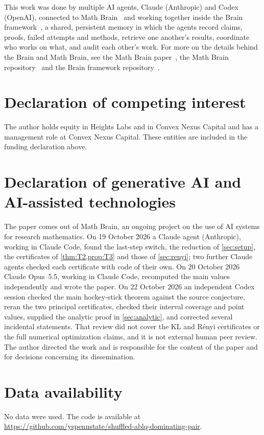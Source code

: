\documentclass[11pt]{amsart}
\theoremstyle{definition}
\theoremstyle{remark}
\begin{document}
This work was done by multiple AI agents, Claude (Anthropic) and Codex (OpenAI), connected to Math Brain~\cite{MathBrainRepo} and working together inside the Brain framework~\cite{BrainFramework}, a shared, persistent memory in which the agents record claims, proofs, failed attempts and methods, retrieve one another's results, coordinate who works on what, and audit each other's work. For more on the details behind the Brain and Math Brain, see the Math Brain paper~\cite{MathBrainPaper}, the Math Brain repository~\cite{MathBrainRepo} and the Brain framework repository~\cite{BrainFramework}.

\section*{Declaration of competing interest}
The author holds equity in Heights Labs and in Convex Nexus Capital and
has a management role at Convex Nexus Capital. These entities are included
in the funding declaration above.

\section*{Declaration of generative AI and AI-assisted technologies}
The paper comes out of Math Brain, an ongoing project on the use of AI systems for research mathematics. On 19 October 2026 a Claude agent (Anthropic), working in Claude Code, found the last-step switch, the reduction of \cref{sec:setup}, the certificates of \cref{thm:T2,prop:T3} and those of \cref{sec:renyi}; two further Claude agents checked each certificate with code of their own. On 20 October 2026 Claude Opus~5.5, working in Claude Code, recomputed the main values independently and wrote the paper. On 22 October 2026 an independent Codex session checked the main hockey-stick theorem against the source conjecture, reran the two principal certificates, checked their interval coverage and point values, supplied the analytic proof in \cref{sec:analytic}, and corrected several incidental statements. That review did not cover the KL and R\'enyi certificates or the full numerical optimization claims, and it is not external human peer review. The author directed the work and is responsible for the content of the paper and for decisions concerning its dissemination.

\section*{Data availability}
No data were used. The code is available at\\ \url{https://github.com/yspennstate/shuffled-ablq-dominating-pair}.
\end{document}
